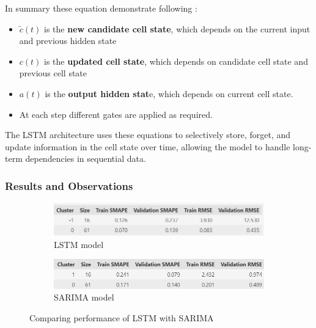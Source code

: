 \documentclass{article}
\begin{document}
\hspace{1em} In summary these equation demonstrate following : 

\begin{itemize}
	\item $\tilde{c}(t)$ is the \textbf{new candidate cell state}, which depends on the current input and previous hidden state 
	
	\item $c(t)$ is the \textbf{updated cell state}, which depends on candidate cell state and  previous cell state 
	
	\item $a(t)$ is the \textbf{output hidden stat}e, which depends on current cell state. 
	
	\item At each step different gates are applied as required. 
\end{itemize}


\hspace{1em} The LSTM architecture uses these equations to selectively store, forget, and update information in the cell state over time, allowing the model to handle long-term dependencies in sequential data.


\subsubsection{Results and Observations}

\begin{figure}[h]
	\centering
	\vspace{1em}
	\begin{subfigure}{0.6\textwidth}
		\includegraphics[width=\linewidth]{images/lstm_results}
		\caption{LSTM model}
		\label{fig:lstm}
	\end{subfigure}
	
	\begin{subfigure}{0.6\textwidth}
		\centering
		\includegraphics[width=\linewidth]{images/benchmark_lstm_with_sarima}
		\caption{SARIMA model}
		\label{fig:lstm_vs_sarima}
	\end{subfigure}
	\caption{Comparing performance of LSTM with SARIMA}
	\label{fig:lstm_sarima_both}
\end{figure}
\end{document}
